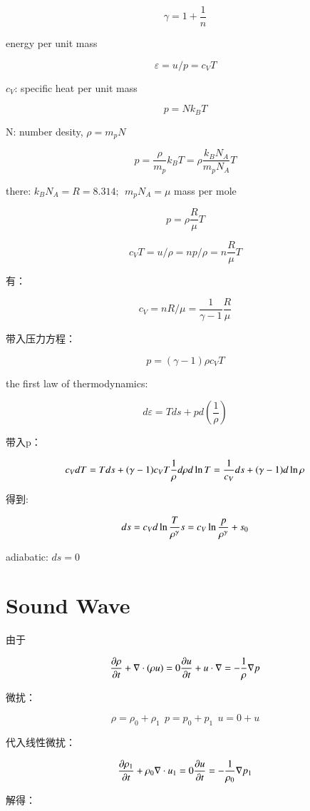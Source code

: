 \documentclass[fontset=windows]{report}
\begin{document}
\[\gamma=1+\frac{1}{n}\]

energy per unit mass

\[\varepsilon =u/p=c_VT\]

\(c_V\): specific heat per unit mass

\[p = Nk_BT\]

N: number desity, \(\rho = m_p N\)

\[p = \frac{\rho}{m_p}k_B T=\rho\frac{k_BN_A}{m_pN_A}T\]

there: \(k_BN_A=R=8.314;\ \ m_pN_A=\mu\) mass per mole

\[p = \rho \frac{R}{\mu}T\]

\[c_VT=u/\rho=np/\rho=n\frac{R}{\mu}T\]

有：

\[c_V = nR/\mu = \frac{1}{\gamma-1}\frac{R}{\mu}\]

带入压力方程：

\[p = (\gamma-1)\rho c_VT\]

the first law of thermodynamics:

\[d\varepsilon = Tds+pd(\frac{1}{\rho})\]

带入p：

\[c_VdT = Tds+(\gamma-1)c_VT\frac{1}{\rho}d\rho\\
d\ln T=\frac{1}{c_V}ds+(\gamma-1)d\ln \rho\]

得到:

\[ds = c_Vd\ln \frac{T}{\rho^{\gamma}}\\
s = c_V\ln\frac{p}{\rho^{\gamma}}+s_0\]

adiabatic: \(ds = 0\)

\section{Sound Wave}

由于

\[\frac{\partial \rho}{\partial t}+\nabla\cdot(\rho u)=0\\
\frac{\partial u}{\partial t}+u\cdot\nabla = -\frac{1}{\rho}\nabla p\]

微扰：

\[\rho=\rho_0+\rho_1 \ \ p = p_0+p_1\ \ u=0+u\]

代入线性微扰：

\[\frac{\partial\rho_1}{\partial t}+\rho_0\nabla\cdot u_1=0\\
\frac{\partial u}{\partial t}=-\frac{1}{\rho_0}\nabla p_1 
\label{eqo}\]

解得：
\end{document}

